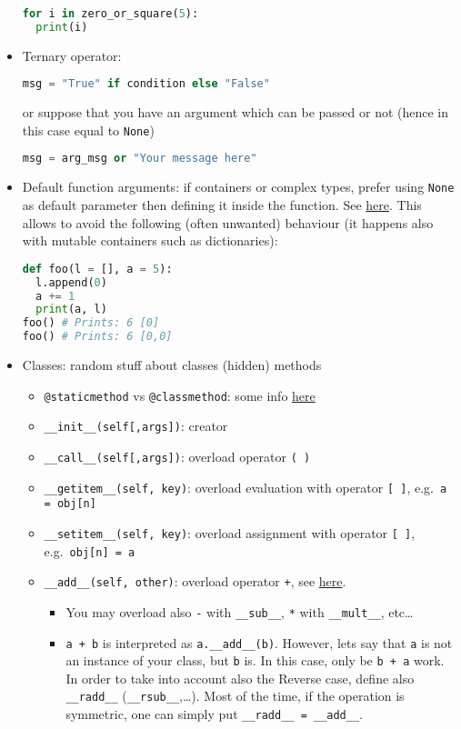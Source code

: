 \documentclass[a4paper,12pt,%
              final%
              ]{article}
\begin{document}
\begin{itemize}
\begin{lstlisting}[language=python]
for i in zero_or_square(5):
  print(i)
\end{lstlisting}
  \item Ternary operator:
\begin{lstlisting}[language=python]
msg = "True" if condition else "False"
\end{lstlisting}
    or suppose that you have an argument which can be passed or not (hence in this case equal to \verb|None|)
\begin{lstlisting}[language=python]
msg = arg_msg or "Your message here"
\end{lstlisting}
  \item Default function arguments: if containers or complex types, prefer using \verb|None| as default parameter then defining it inside the function. See \href{https://www.geeksforgeeks.org/default-arguments-in-python/}{here}. This allows to avoid the following (often unwanted) behaviour (it happens also with mutable containers such as dictionaries):
\begin{lstlisting}[language=python]
def foo(l = [], a = 5):
  l.append(0)
  a += 1
  print(a, l)
foo() # Prints: 6 [0]
foo() # Prints: 6 [0,0]
\end{lstlisting}
  \item Classes: random stuff about classes (hidden) methods
    \begin{itemize}
      \item \verb|@staticmethod| vs \verb|@classmethod|: some info \href{https://www.geeksforgeeks.org/class-method-vs-static-method-python/}{here}
      \item \verb|__init__(self[,args])|: creator
      \item \verb|__call__(self[,args])|: overload operator \verb|( )|
      \item \verb|__getitem__(self, key)|: overload evaluation with operator \verb|[ ]|, e.g.\ \verb|a = obj[n]|
      \item \verb|__setitem__(self, key)|: overload assignment with operator \verb|[ ]|, e.g.\ \verb|obj[n] = a|
      \item \verb|__add__(self, other)|: overload operator \verb|+|, see \href{https://docs.python.org/3/reference/datamodel.html#emulating-numeric-types}{here}.
        \begin{itemize}
          \item You may overload also \verb|-| with \verb|__sub__|, \texttt{*} with \verb|__mult__|, etc\ldots
          \item \verb|a + b| is interpreted as \verb|a.__add__(b)|. However, lets say that \texttt{a} is not an instance of your class, but \verb|b| is. In this case, only be \verb|b + a| work. In order to take into account also the Reverse case, define also \verb|__radd__| (\verb|__rsub__|,\ldots). Most of the time, if the operation is symmetric, one can simply put \verb|__radd__ = __add__|.

\end{itemize}
\end{itemize}
\end{itemize}
\end{document}
